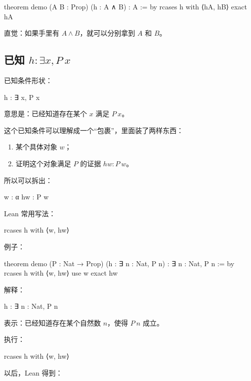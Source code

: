 \documentclass[UTF8,12pt]{ctexart}
\begin{document}
\begin{LeanCode}
theorem demo
  (A B : Prop)
  (h : A ∧ B) :
  A := by
  rcases h with ⟨hA, hB⟩
  exact hA
\end{LeanCode}

直觉：如果手里有 \(A \land B\)，就可以分别拿到 \(A\) 和 \(B\)。

\subsection{已知 \(h : \exists x, P\ x\)}

已知条件形状：

\begin{LeanCode}
h : ∃ x, P x
\end{LeanCode}

意思是：已经知道存在某个 \(x\) 满足 \(P\ x\)。

这个已知条件可以理解成一个“包裹”，里面装了两样东西：
\begin{enumerate}
  \item 某个具体对象 \(w\)；
  \item 证明这个对象满足 \(P\) 的证据 \(hw : P\ w\)。
\end{enumerate}

所以可以拆出：

\begin{LeanCode}
w : α
hw : P w
\end{LeanCode}

Lean 常用写法：

\begin{LeanCode}
rcases h with ⟨w, hw⟩
\end{LeanCode}

例子：

\begin{LeanCode}
theorem demo
  (P : Nat → Prop)
  (h : ∃ n : Nat, P n) :
  ∃ n : Nat, P n := by
  rcases h with ⟨w, hw⟩
  use w
  exact hw
\end{LeanCode}

解释：

\begin{LeanCode}
h : ∃ n : Nat, P n
\end{LeanCode}

表示：已经知道存在某个自然数 \(n\)，使得 \(P\ n\) 成立。

执行：

\begin{LeanCode}
rcases h with ⟨w, hw⟩
\end{LeanCode}

以后，Lean 得到：
\end{document}
